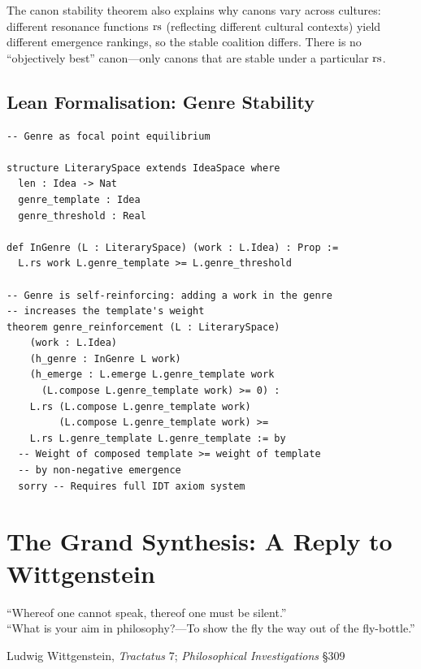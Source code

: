 \begin{remark}
The canon stability theorem also explains why canons vary across
cultures: different resonance functions $\mathrm{rs}$ (reflecting different
cultural contexts) yield different emergence rankings, so the
stable coalition differs.  There is no ``objectively best''
canon---only canons that are stable under a particular $\mathrm{rs}$.
\end{remark}

\section{Lean Formalisation: Genre Stability}
\label{sec:art-lean}

\begin{lstlisting}[caption={Genre as focal point equilibrium in Lean 4},label={lst:genre}]
-- Genre as focal point equilibrium

structure LiterarySpace extends IdeaSpace where
  len : Idea -> Nat
  genre_template : Idea
  genre_threshold : Real

def InGenre (L : LiterarySpace) (work : L.Idea) : Prop :=
  L.rs work L.genre_template >= L.genre_threshold

-- Genre is self-reinforcing: adding a work in the genre
-- increases the template's weight
theorem genre_reinforcement (L : LiterarySpace)
    (work : L.Idea)
    (h_genre : InGenre L work)
    (h_emerge : L.emerge L.genre_template work
      (L.compose L.genre_template work) >= 0) :
    L.rs (L.compose L.genre_template work)
         (L.compose L.genre_template work) >=
    L.rs L.genre_template L.genre_template := by
  -- Weight of composed template >= weight of template
  -- by non-negative emergence
  sorry -- Requires full IDT axiom system
\end{lstlisting}



\chapter{The Grand Synthesis: A Reply to Wittgenstein}
\label{ch:grand-synthesis}

\epigraph{``Whereof one cannot speak, thereof one must be silent.''\\ \medskip
``What is your aim in philosophy?---To show the fly the
way out of the fly-bottle.''}{Ludwig Wittgenstein, \textit{Tractatus} 7; \textit{Philosophical Investigations} \S309}

